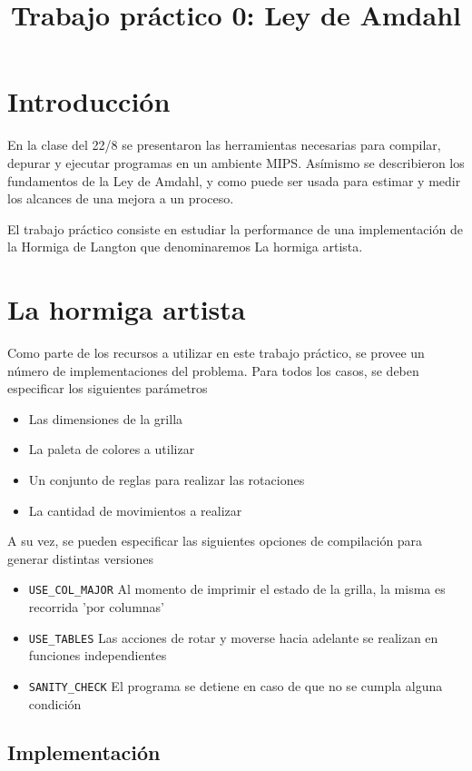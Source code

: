 \documentclass{article}
\author{}
\title{Trabajo práctico 0: Ley de Amdahl}
\begin{document}
\date{}
\maketitle

\section{Introducción}

En la clase del 22/8 se presentaron las herramientas necesarias para compilar, depurar y ejecutar programas en un 
ambiente MIPS. Asímismo se describieron los fundamentos de la Ley de Amdahl, y como puede ser usada para estimar
y medir los alcances de una mejora a un proceso.

El trabajo práctico consiste en estudiar la performance de una implementación de la Hormiga de Langton que denominaremos
La hormiga artista.

\pagebreak

\section{La hormiga artista}

Como parte de los recursos a utilizar en este trabajo práctico, se provee un número de implementaciones del problema.
Para todos los casos, se deben especificar los siguientes parámetros
\begin{itemize}
\item Las dimensiones de la grilla
\item La paleta de colores a utilizar
\item Un conjunto de reglas para realizar las rotaciones
\item La cantidad de movimientos a realizar
\end{itemize}

A su vez, se pueden especificar las siguientes opciones de compilación para generar distintas versiones
\begin{itemize}
\item \texttt{USE\_COL\_MAJOR}
Al momento de imprimir el estado de la grilla, la misma es recorrida 'por columnas'
\item \texttt{USE\_TABLES}
Las acciones de rotar y moverse hacia adelante se realizan en funciones independientes
\item \texttt{SANITY\_CHECK}
El programa se detiene en caso de que no se cumpla alguna condición
\end{itemize}

\subsection{Implementación}
\end{document}
